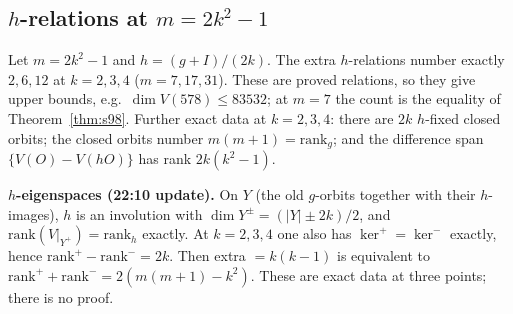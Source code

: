 \subsection{$h$-relations at $m=2k^2-1$}\label{sec:rev6h}
\begin{proposition}\label{prop:h6}
Let $m=2k^2-1$ and $h=(g+I)/(2k)$. The extra $h$-relations number exactly $2,6,12$ at $k=2,3,4$ ($m=7,17,31$). These are proved relations, so they give upper bounds, e.g.\ $\dim V(578)\le83532$; at $m=7$ the count is the equality of Theorem~\ref{thm:s98}. Further exact data at $k=2,3,4$: there are $2k$ $h$-fixed closed orbits; the closed orbits number $m(m+1)=\mathrm{rank}_g$; and the difference span $\{V(O)-V(hO)\}$ has rank $2k(k^2-1)$.
\end{proposition}
\noindent\textbf{$h$-eigenspaces (22:10 update).} On $Y$ (the old $g$-orbits together with their $h$-images), $h$ is an involution with $\dim Y^\pm=(|Y|\pm2k)/2$, and $\mathrm{rank}(V|_{Y^+})=\mathrm{rank}_h$ exactly. At $k=2,3,4$ one also has $\ker^+=\ker^-$ exactly, hence $\mathrm{rank}^+-\mathrm{rank}^-=2k$. Then extra $=k(k-1)$ is equivalent to $\mathrm{rank}^++\mathrm{rank}^-=2(m(m+1)-k^2)$. These are exact data at three points; there is no proof.

